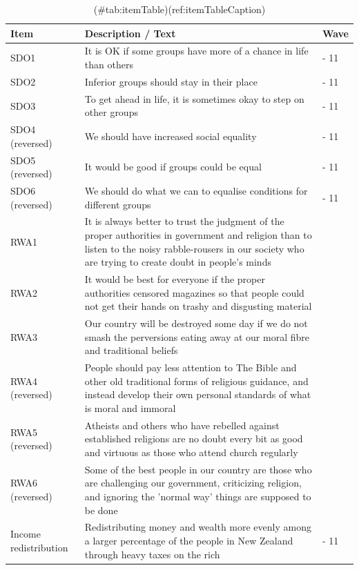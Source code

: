 \begin{appendix}
\begin{longtable}[t]{>{\raggedright\arraybackslash}p{8em}>{\raggedright\arraybackslash}p{26em}>{\raggedright\arraybackslash}p{6em}}
\caption{(\#tab:itemTable)(ref:itemTableCaption)}\\
\toprule
Item & Description / Text & Wave\\
\midrule
SDO1 & It is OK if some groups have more of a chance in life than others & 10 - 11\\
SDO2 & Inferior groups should stay in their place & 10 - 11\\
SDO3 & To get ahead in life, it is sometimes okay to step on other groups & 10 - 11\\
SDO4 (reversed) & We should have increased social equality & 10 - 11\\
SDO5 (reversed) & It would be good if groups could be equal & 10 - 11\\
\addlinespace
SDO6 (reversed) & We should do what we can to equalise conditions for different groups & 10 - 11\\
RWA1 & It is always better to trust the judgment of the proper authorities in government and religion than to listen to the noisy rabble-rousers in our society who are trying to create doubt in people's minds & 10\\
RWA2 & It would be best for everyone if the proper authorities censored magazines so that people could not get their hands on trashy and disgusting material & 10\\
RWA3 & Our country will be destroyed some day if we do not smash the perversions eating away at our moral fibre and traditional beliefs & 10\\
RWA4 (reversed) & People should pay less attention to The Bible and other old traditional forms of religious guidance, and instead develop their own personal standards of what is moral and immoral & 10\\
\addlinespace
RWA5 (reversed) & Atheists and others who have rebelled against established religions are no doubt every bit as good and virtuous as those who attend church regularly & 10\\
RWA6 (reversed) & Some of the best people in our country are those who are challenging our government, criticizing religion, and ignoring the 'normal way' things are supposed to be done & 10\\
Income redistribution & Redistributing money and wealth more evenly among a larger percentage of the people in New Zealand through heavy taxes on the rich & 10 - 11\\

\end{longtable}
\end{appendix}
